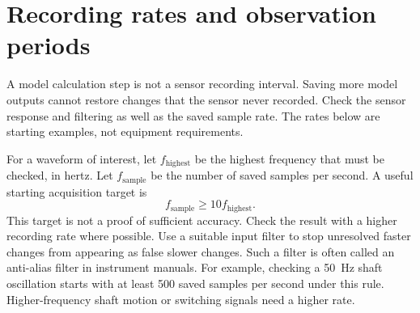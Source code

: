 \documentclass[11pt,a4paper]{report}
\begin{document}
\section{Recording rates and observation periods}
A model calculation step is not a sensor recording interval.
Saving more model outputs cannot restore changes that the sensor never recorded.
Check the sensor response and filtering as well as the saved sample rate.
The rates below are starting examples, not equipment requirements.

For a waveform of interest, let $f_{\mathrm{highest}}$ be the highest frequency that must be checked, in hertz.
Let $f_{\mathrm{sample}}$ be the number of saved samples per second.
A useful starting acquisition target is
\begin{equation}
f_{\mathrm{sample}}\geq 10 f_{\mathrm{highest}}.
\label{eq:field-sample-target}
\end{equation}
This target is not a proof of sufficient accuracy.
Check the result with a higher recording rate where possible.
Use a suitable input filter to stop unresolved faster changes from appearing as false slower changes.
Such a filter is often called an anti-alias filter in instrument manuals.
For example, checking a 50~Hz shaft oscillation starts with at least 500 saved samples per second under this rule.
Higher-frequency shaft motion or switching signals need a higher rate.
\end{document}
